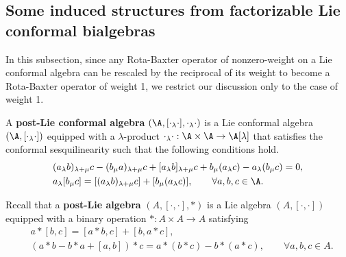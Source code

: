 \documentclass[12pt]{amsart}
\begin{document}
\subsection{Some induced structures from  factorizable Lie conformal bialgebras}
In this subsection,  since any  Rota-Baxter operator of
nonzero-weight on  a Lie conformal algebra can be rescaled by the
reciprocal of its weight to become a Rota-Baxter operator of
weight 1, we restrict our discussion only to the case of weight 1.
\begin{definition}\label{plca}\cite{YT}
A {\bf post-Lie conformal algebra} $(\A,[\cdot_\lambda\cdot],
\cdot_\lambda\cdot)$   is a Lie conformal algebra
$(\A,[\cdot_\lambda\cdot])$ equipped with a $\lambda$-product
$\cdot_\lambda\cdot: \A\times \A \rightarrow \A[\lambda]$ that
satisfies the conformal sesquilinearity such that the following
conditions hold.
\begin{align}
    \label{eqpl2}& (a_\lambda b)_{\lambda+\mu}c-(b_\mu a)_{\lambda+\mu}c+[a_\lambda b]_{\lambda+\mu}c+b_\mu(a_\lambda c)- a_\lambda(b_\mu c)=0,\\
    \label{eqpl3}& a_\lambda[b_\mu c]=[(a_\lambda b)_{\lambda+\mu}c]+[b_\mu(a_\lambda c)],  \qquad  \forall   a,b,c\in \A.
\end{align}

\end{definition}
\begin{remark}
     Recall \cite{V} that a {\bf post-Lie algebra} $(A,[\cdot,\cdot],\ast)$ is a Lie algebra $(A,[\cdot,\cdot])$ equipped with a binary operation $\ast:A\times A\rightarrow A$ satisfying
    \begin{align*}
        &a\ast[b,c]=[a\ast b,c]+[b,a\ast c],\\
        &(a\ast b-b\ast a+[a,b] )\ast c=a\ast(b\ast c)-b\ast(a\ast c), \qquad \forall a,b,c\in A.
    \end{align*}
\end{remark}
\end{document}

